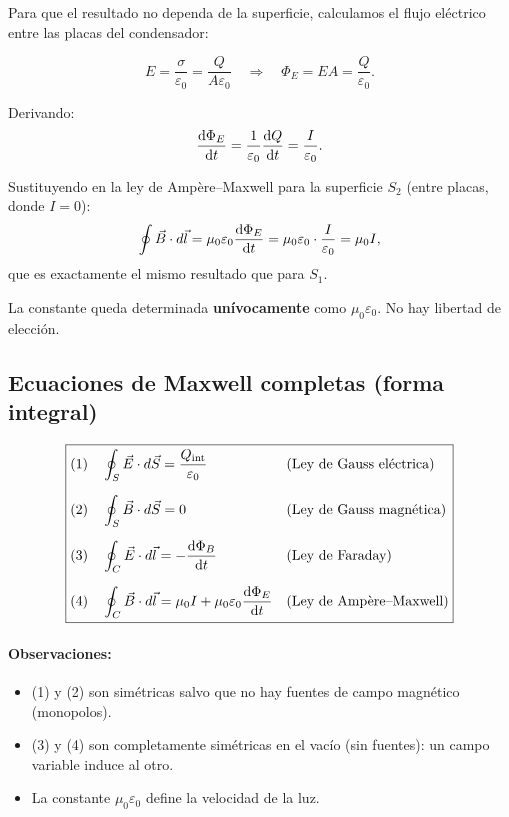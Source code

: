 \documentclass[12pt,a4paper]{article}
\begin{document}
Para que el resultado no dependa de la superficie, calculamos el
flujo eléctrico entre las placas del condensador:

\[
E = \frac{\sigma}{\varepsilon_0} = \frac{Q}{A \varepsilon_0}
\quad\Rightarrow\quad
\Phi_E = E A = \frac{Q}{\varepsilon_0}.
\]

Derivando:
\[
\dv{\Phi_E}{t} = \frac{1}{\varepsilon_0} \dv{Q}{t}
               = \frac{I}{\varepsilon_0}.
\]

Sustituyendo en la ley de Ampère–Maxwell para la superficie
\(S_2\) (entre placas, donde \(I = 0\)):
\[
\oint \vec B \cdot d\vec l
= \mu_0 \varepsilon_0 \dv{\Phi_E}{t}
= \mu_0 \varepsilon_0 \cdot \frac{I}{\varepsilon_0}
= \mu_0 I,
\]
que es exactamente el mismo resultado que para \(S_1\).

\begin{keybox}
  La constante queda determinada \textbf{unívocamente} como
  \(\mu_0 \varepsilon_0\). No hay libertad de elección.
\end{keybox}

\subsection{Ecuaciones de Maxwell completas (forma integral)}

\[
\boxed{
\begin{aligned}
\text{(1)} &\quad \oint_S \vec E \cdot d\vec S
            = \frac{Q_{\text{int}}}{\varepsilon_0}
            &&\text{(Ley de Gauss eléctrica)} \\[6pt]
\text{(2)} &\quad \oint_S \vec B \cdot d\vec S = 0
            &&\text{(Ley de Gauss magnética)} \\[6pt]
\text{(3)} &\quad \oint_C \vec E \cdot d\vec l
            = -\dv{\Phi_B}{t}
            &&\text{(Ley de Faraday)} \\[6pt]
\text{(4)} &\quad \oint_C \vec B \cdot d\vec l
            = \mu_0 I + \mu_0 \varepsilon_0 \dv{\Phi_E}{t}
            &&\text{(Ley de Ampère--Maxwell)}
\end{aligned}}
\]

\paragraph{Observaciones:}
\begin{itemize}
  \item (1) y (2) son simétricas salvo que no hay fuentes de campo
        magnético (monopolos).
  \item (3) y (4) son completamente simétricas en el vacío (sin
        fuentes): un campo variable induce al otro.
  \item La constante \(\mu_0 \varepsilon_0\) define la velocidad de
        la luz.
\end{itemize}
\end{document}
